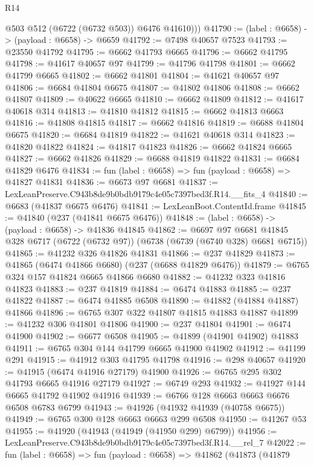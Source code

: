 \begin{lexlean}{R14}
\begin{coremodule}
          @503
          @512
          (@6722 (@6732 @503))
          @6476
          @41610)))
@41790 := (label : @6658) -> (payload : @6658) -> @6659
@41792 := @7498 @40657 @7523
@41793 := @23550 @41792
@41795 := @6662 @41793 @6665
@41796 := @6662 @41795
@41798 := @41617 @40657 @97
@41799 := @41796 @41798
@41801 := @6662 @41799 @6665
@41802 := @6662 @41801
@41804 := @41621 @40657 @97
@41806 := @6684 @41804 @6675
@41807 := @41802 @41806
@41808 := @6662 @41807
@41809 := @40622 @6665
@41810 := @6662 @41809
@41812 := @41617 @40618 @314
@41813 := @41810 @41812
@41815 := @6662 @41813 @6663
@41816 := @41808 @41815
@41817 := @6662 @41816
@41819 := @6688 @41804 @6675
@41820 := @6684 @41819
@41822 := @41621 @40618 @314
@41823 := @41820 @41822
@41824 := @41817 @41823
@41826 := @6662 @41824 @6665
@41827 := @6662 @41826
@41829 := @6688 @41819 @41822
@41831 := @6684 @41829 @6476
@41834 := fun (label : @6658) => fun (payload : @6658) => @41827 @41831
@41836 := @6673 @97 @6681
@41837 := LexLeanPreserve.C943b8de9b0bdb9179c4e05c7397bed3f.R14.__fits_4
@41840 := @6683 (@41837 @6675 @6476)
@41841 := LexLeanBoot.ContentId.frame
@41845 := @41840 (@237 (@41841 @6675 @6476))
@41848 := (label : @6658) -> (payload : @6658) -> @41836 @41845
@41862 := @6697
    @97
    @6681
    @41845
    @328
    @6717
    (@6722 (@6732 @97))
    (@6738 (@6739 (@6740 @328) @6681 @6715))
@41865 := @41232 @326 @41826 @41831
@41866 := @237 @41829
@41873 := @41865 (@6474 @41866 @6680) (@237 (@6688 @41829 @6476))
@41879 := @6765 @324 @157 @41824 @6665 @41866 @6680
@41882 := @41232 @323 @41816 @41823
@41883 := @237 @41819
@41884 := @6474 @41883
@41885 := @237 @41822
@41887 := @6474 @41885 @6508
@41890 := @41882 (@41884 @41887) @41866
@41896 := @6765 @307 @322 @41807 @41815 @41883 @41887
@41899 := @41232 @306 @41801 @41806
@41900 := @237 @41804
@41901 := @6474 @41900
@41902 := @6677 @6508
@41905 := @41899 (@41901 @41902) @41883
@41911 := @6765 @304 @144 @41799 @6665 @41900 @41902
@41912 := @41199 @291
@41915 := @41912 @303 @41795 @41798
@41916 := @298 @40657
@41920 := @41915 (@6474 @41916 @27179) @41900
@41926 := @6765 @295 @302 @41793 @6665 @41916 @27179
@41927 := @6749 @293
@41932 := @41927 @144 @6665 @41792 @41902 @41916
@41939 := @6766 @128 @6663 @6663 @6676 @6508 @6783 @6799
@41943 := @41926 (@41932 @41939 (@40758 @6675))
@41949 := @6765 @300 @128 @6663 @6663 @299 @6508
@41950 := @41267 @53
@41955 := @41920 (@41943 (@41949 (@41950 @299) @6799))
@41956 := LexLeanPreserve.C943b8de9b0bdb9179c4e05c7397bed3f.R14.__rel_7
@42022 := fun (label : @6658) =>
  fun (payload : @6658) =>
  @41862
    (@41873
      (@41879

\end{coremodule}
\end{lexlean}
